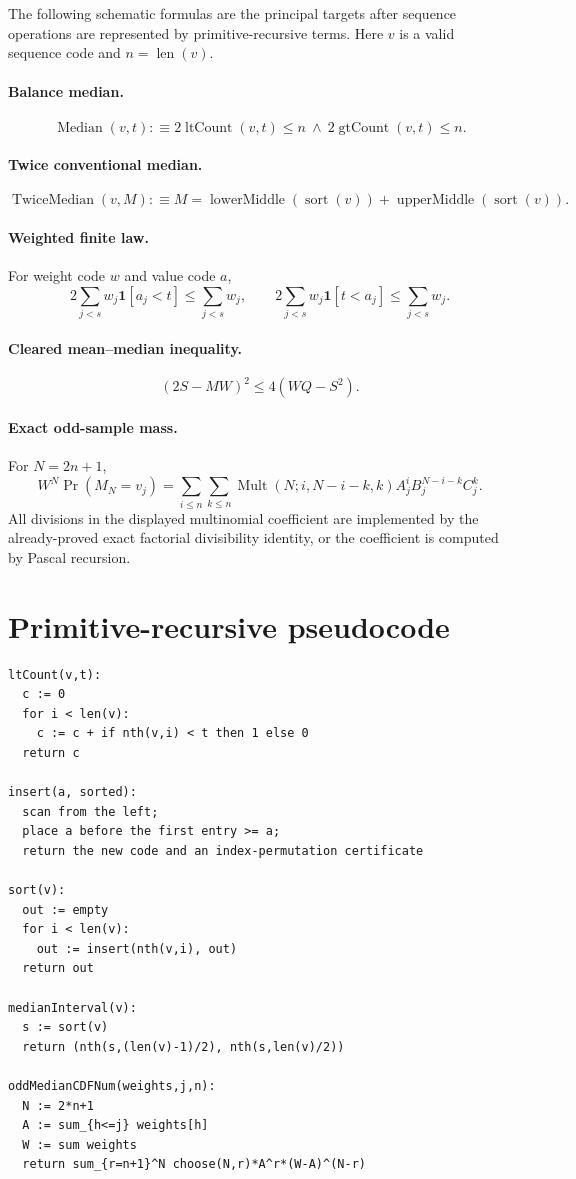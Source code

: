 \documentclass[11pt]{article}
\newcommand{\ind}{\mathbf 1}
\begin{document}
The following schematic formulas are the principal targets after sequence
operations are represented by primitive-recursive terms.  Here $v$ is a valid
sequence code and $n=\operatorname{len}(v)$.

\paragraph{Balance median.}
\[
 \operatorname{Median}(v,t):\equiv
  2\operatorname{ltCount}(v,t)\leq n\ \wedge\
  2\operatorname{gtCount}(v,t)\leq n.
\]

\paragraph{Twice conventional median.}
\[
 \operatorname{TwiceMedian}(v,M):\equiv
 M=\operatorname{lowerMiddle}(\operatorname{sort}(v))
  +\operatorname{upperMiddle}(\operatorname{sort}(v)).
\]

\paragraph{Weighted finite law.}
For weight code $w$ and value code $a$,
\[
 2\sum_{j<s}w_j\ind[a_j<t]\leq\sum_{j<s}w_j,
 \qquad
 2\sum_{j<s}w_j\ind[t<a_j]\leq\sum_{j<s}w_j.
\]

\paragraph{Cleared mean--median inequality.}
\[
 (2S-MW)^2\leq4(WQ-S^2).
\]

\paragraph{Exact odd-sample mass.}
For $N=2n+1$,
\[
 W^N\Pr(M_N=v_j)=
 \sum_{i\leq n}\sum_{k\leq n}
 \operatorname{Mult}(N;i,N-i-k,k)
 A_j^iB_j^{N-i-k}C_j^k.
\]
All divisions in the displayed multinomial coefficient are implemented by the
already-proved exact factorial divisibility identity, or the coefficient is
computed by Pascal recursion.

\section{Primitive-recursive pseudocode}

\begin{lstlisting}[language={}]
ltCount(v,t):
  c := 0
  for i < len(v):
    c := c + if nth(v,i) < t then 1 else 0
  return c

insert(a, sorted):
  scan from the left;
  place a before the first entry >= a;
  return the new code and an index-permutation certificate

sort(v):
  out := empty
  for i < len(v):
    out := insert(nth(v,i), out)
  return out

medianInterval(v):
  s := sort(v)
  return (nth(s,(len(v)-1)/2), nth(s,len(v)/2))

oddMedianCDFNum(weights,j,n):
  N := 2*n+1
  A := sum_{h<=j} weights[h]
  W := sum weights
  return sum_{r=n+1}^N choose(N,r)*A^r*(W-A)^(N-r)
\end{lstlisting}
\end{document}
